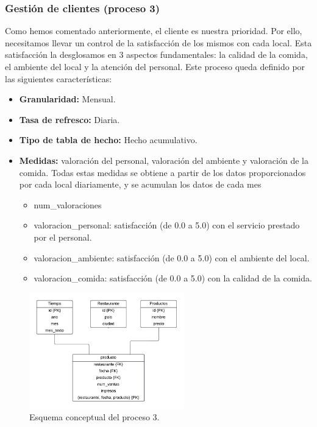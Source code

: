 \documentclass[12pt]{opticajnl}
\begin{document}
\subsubsection{Gestión de clientes (proceso 3)}

Como hemos comentado anteriormente, el cliente es nuestra prioridad. Por ello, necesitamos llevar un control de la satisfacción de los mismos con cada local. Esta satisfacción la desglosamos en 3 aspectos fundamentales: la calidad de la comida, el ambiente del local y la atención del personal. Este proceso queda definido por las siguientes características:
\begin{itemize}
\item \textbf{Granularidad:} Mensual.
\item \textbf{Tasa de refresco:} Diaria.
\item \textbf{Tipo de tabla de hecho:} Hecho acumulativo.
\item \textbf{Medidas:} valoración del personal, valoración del ambiente y valoración de la comida. Todas estas medidas se obtiene a partir de los datos proporcionados por cada local diariamente, y se acumulan los datos de cada mes
\begin{itemize}
\item num\_valoraciones
\item valoracion\_personal: satisfacción (de 0.0 a 5.0) con el servicio prestado por el personal.
\item valoracion\_ambiente: satisfacción (de 0.0 a 5.0) con el ambiente del local.
\item valoracion\_comida: satisfacción (de 0.0 a 5.0) con la calidad de la comida.
\end{itemize}
\end{itemize}

\begin{figure}[H]
\centering
\includegraphics[width=0.6\textwidth]{fotos/feed.pdf}
\caption{Esquema conceptual del proceso 3.}
\label{fig:esquema_proceso3}
\end{figure}
\end{document}
